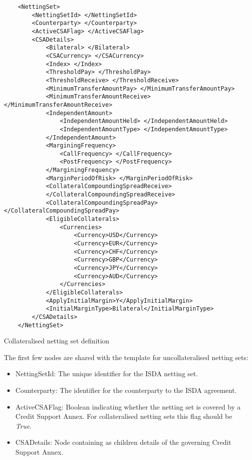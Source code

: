 \begin{listing}[H]
\begin{verbatim}
    <NettingSet>
        <NettingSetId> </NettingSetId>
        <Counterparty> </Counterparty>
        <ActiveCSAFlag> </ActiveCSAFlag>
        <CSADetails>
            <Bilateral> </Bilateral>
            <CSACurrency> </CSACurrency>
            <Index> </Index>
            <ThresholdPay> </ThresholdPay>
            <ThresholdReceive> </ThresholdReceive>
            <MinimumTransferAmountPay> </MinimumTransferAmountPay>
            <MinimumTransferAmountReceive> </MinimumTransferAmountReceive>
            <IndependentAmount>
                <IndependentAmountHeld> </IndependentAmountHeld>
                <IndependentAmountType> </IndependentAmountType>
            </IndependentAmount>
            <MarginingFrequency>
                <CallFrequency> </CallFrequency>
                <PostFrequency> </PostFrequency>
            </MarginingFrequency>
            <MarginPeriodOfRisk> </MarginPeriodOfRisk>
            <CollateralCompoundingSpreadReceive> 
            </CollateralCompoundingSpreadReceive>
            <CollateralCompoundingSpreadPay> </CollateralCompoundingSpreadPay>
            <EligibleCollaterals>
                <Currencies>
                    <Currency>USD</Currency>
                    <Currency>EUR</Currency>
                    <Currency>CHF</Currency>
                    <Currency>GBP</Currency>
                    <Currency>JPY</Currency>
                    <Currency>AUD</Currency>
                </Currencies>
            </EligibleCollaterals>
            <ApplyInitialMargin>Y</ApplyInitialMargin>
            <InitialMarginType>Bilateral</InitialMarginType>
        </CSADetails>
    </NettingSet>
\end{verbatim}
\caption{Collateralised netting set definition}
\label{lst:nettingSetCollat}
\end{listing}

The first few nodes are shared with the template for uncollateralised
netting sets:
\begin{itemize}
\item NettingSetId: The unique identifier for the ISDA netting set.
\item Counterparty: The identifier for the counterparty to the ISDA agreement.
\item ActiveCSAFlag: Boolean indicating whether the netting set is
  covered by a Credit Support Annex. For collateralised netting sets
  this flag should be \emph{True}.
\item CSADetails: Node containing as children details of the governing
  Credit Support Annex. 
\end{itemize}

